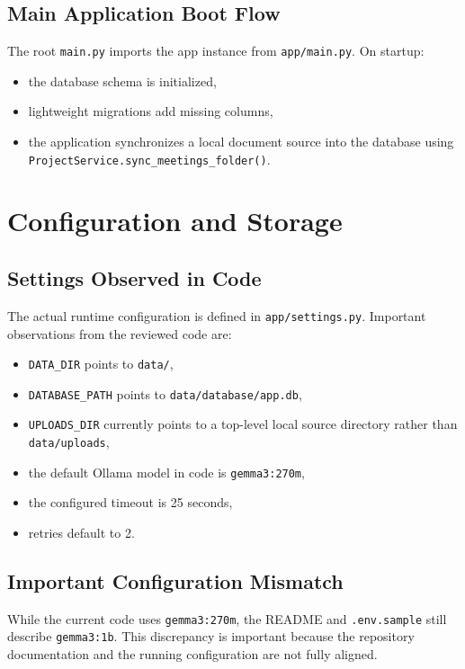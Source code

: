 \documentclass[12pt, a4paper]{article}
\begin{document}
\subsection{Main Application Boot Flow}
The root \texttt{main.py} imports the app instance from \texttt{app/main.py}. On startup:
\begin{itemize}
\item the database schema is initialized,
\item lightweight migrations add missing columns,
\item the application synchronizes a local document source into the database using \texttt{ProjectService.sync\_meetings\_folder()}.
\end{itemize}

\section{Configuration and Storage}
\subsection{Settings Observed in Code}
The actual runtime configuration is defined in \texttt{app/settings.py}. Important observations from the reviewed code are:
\begin{itemize}
\item \texttt{DATA\_DIR} points to \texttt{data/},
\item \texttt{DATABASE\_PATH} points to \texttt{data/database/app.db},
\item \texttt{UPLOADS\_DIR} currently points to a top-level local source directory rather than \texttt{data/uploads},
\item the default Ollama model in code is \texttt{gemma3:270m},
\item the configured timeout is 25 seconds,
\item retries default to 2.
\end{itemize}

\subsection{Important Configuration Mismatch}
While the current code uses \texttt{gemma3:270m}, the README and \texttt{.env.sample} still describe \texttt{gemma3:1b}. This discrepancy is important because the repository documentation and the running configuration are not fully aligned.
\end{document}
